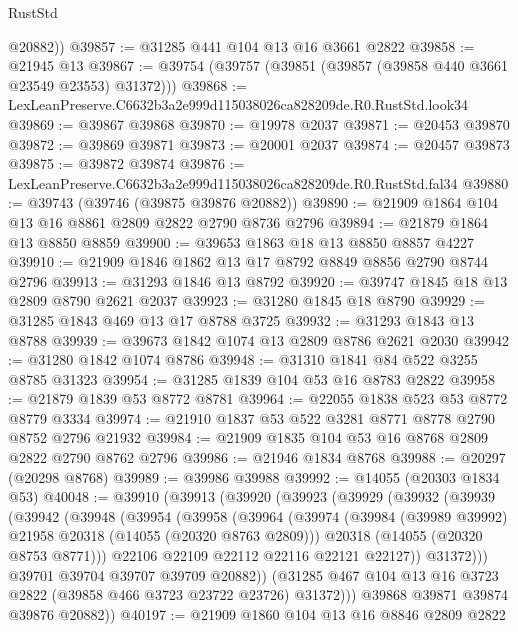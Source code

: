 \begin{lexlean}{RustStd}
\begin{coremodule}
        @20882))
@39857 := @31285 @441 @104 @13 @16 @3661 @2822
@39858 := @21945 @13
@39867 := @39754 (@39757 (@39851 (@39857 (@39858 @440 @3661 @23549 @23553) @31372)))
@39868 := LexLeanPreserve.C6632b3a2e999d115038026ca828209de.R0.RustStd.look34
@39869 := @39867 @39868
@39870 := @19978 @2037
@39871 := @20453 @39870
@39872 := @39869 @39871
@39873 := @20001 @2037
@39874 := @20457 @39873
@39875 := @39872 @39874
@39876 := LexLeanPreserve.C6632b3a2e999d115038026ca828209de.R0.RustStd.fal34
@39880 := @39743 (@39746 (@39875 @39876 @20882))
@39890 := @21909 @1864 @104 @13 @16 @8861 @2809 @2822 @2790 @8736 @2796
@39894 := @21879 @1864 @13 @8850 @8859
@39900 := @39653 @1863 @18 @13 @8850 @8857 @4227
@39910 := @21909 @1846 @1862 @13 @17 @8792 @8849 @8856 @2790 @8744 @2796
@39913 := @31293 @1846 @13 @8792
@39920 := @39747 @1845 @18 @13 @2809 @8790 @2621 @2037
@39923 := @31280 @1845 @18 @8790
@39929 := @31285 @1843 @469 @13 @17 @8788 @3725
@39932 := @31293 @1843 @13 @8788
@39939 := @39673 @1842 @1074 @13 @2809 @8786 @2621 @2030
@39942 := @31280 @1842 @1074 @8786
@39948 := @31310 @1841 @84 @522 @3255 @8785 @31323
@39954 := @31285 @1839 @104 @53 @16 @8783 @2822
@39958 := @21879 @1839 @53 @8772 @8781
@39964 := @22055 @1838 @523 @53 @8772 @8779 @3334
@39974 := @21910 @1837 @53 @522 @3281 @8771 @8778 @2790 @8752 @2796 @21932
@39984 := @21909 @1835 @104 @53 @16 @8768 @2809 @2822 @2790 @8762 @2796
@39986 := @21946 @1834 @8768
@39988 := @20297 (@20298 @8768)
@39989 := @39986 @39988
@39992 := @14055 (@20303 @1834 @53)
@40048 := @39910
    (@39913
      (@39920
        (@39923
          (@39929
            (@39932
              (@39939
                (@39942
                  (@39948
                    (@39954
                      (@39958
                        (@39964
                          (@39974
                            (@39984 (@39989 @39992) @21958 @20318 (@14055 (@20320 @8763 @2809)))
                            @20318
                            (@14055 (@20320 @8753 @8771)))
                          @22106
                          @22109
                          @22112
                          @22116
                          @22121
                          @22127))
                      @31372)))
                @39701
                @39704
                @39707
                @39709
                @20882))
            (@31285 @467 @104 @13 @16 @3723 @2822 (@39858 @466 @3723 @23722 @23726) @31372)))
        @39868
        @39871
        @39874
        @39876
        @20882))
@40197 := @21909
    @1860
    @104
    @13
    @16
    @8846
    @2809
    @2822

\end{coremodule}
\end{lexlean}
